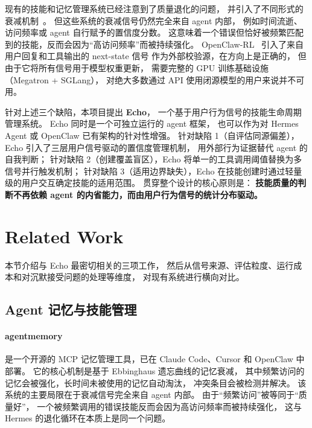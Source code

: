 \documentclass[12pt,a4paper]{article}
\begin{document}
	现有的技能和记忆管理系统已经注意到了质量退化的问题，
	并引入了不同形式的衰减机制~\cite{agentmemory, oc_memory_tools}。
	但这些系统的衰减信号仍然完全来自 agent 内部，
	例如时间流逝、访问频率或 agent 自行赋予的置信度分数。
	这意味着一个错误但恰好被频繁匹配到的技能，反而会因为``高访问频率''而被持续强化。
	OpenClaw-RL~\cite{openclaw_rl} 引入了来自用户回复和工具输出的 next-state 信号
	作为外部校验源，在方向上是正确的，
	但由于它将所有信号用于模型权重更新，
	需要完整的 GPU 训练基础设施（Megatron + SGLang），
	对绝大多数通过 API 使用闭源模型的用户来说并不可用。
	
	针对上述三个缺陷，本项目提出 \textbf{Echo}，
	一个基于用户行为信号的技能生命周期管理系统。
	Echo 同时是一个可独立运行的 agent 框架，
	也可以作为对 Hermes Agent 或 OpenClaw 已有架构的针对性增强。
	针对缺陷 1（自评估同源偏差），Echo 引入了三层用户信号驱动的置信度管理机制，
	用外部行为证据替代 agent 的自我判断；
	针对缺陷 2（创建覆盖盲区），Echo 将单一的工具调用阈值替换为多信号并行触发机制；
	针对缺陷 3（适用边界缺失），Echo 在技能创建时通过轻量级的用户交互确定技能的适用范围。
	贯穿整个设计的核心原则是：
	\textbf{技能质量的判断不再依赖 agent 的内省能力，而由用户行为信号的统计分布驱动。}
	
	
	\section{Related Work}
	
	本节介绍与 Echo 最密切相关的三项工作，
	然后从信号来源、评估粒度、运行成本和对沉默接受问题的处理等维度，
	对现有系统进行横向对比。
	
	\subsection{Agent 记忆与技能管理}
	
	\paragraph{agentmemory~\cite{agentmemory}}
	是一个开源的 MCP 记忆管理工具，已在 Claude Code、Cursor 和 OpenClaw 中部署。
	它的核心机制是基于 Ebbinghaus 遗忘曲线的记忆衰减，
	其中频繁访问的记忆会被强化，长时间未被使用的记忆自动淘汰，
	冲突条目会被检测并解决。
	该系统的主要局限在于衰减信号完全来自 agent 内部。
	由于``频繁访问''被等同于``质量好''，
	一个被频繁调用的错误技能反而会因为高访问频率而被持续强化，
	这与 Hermes 的退化循环在本质上是同一个问题。
	
\end{document}
